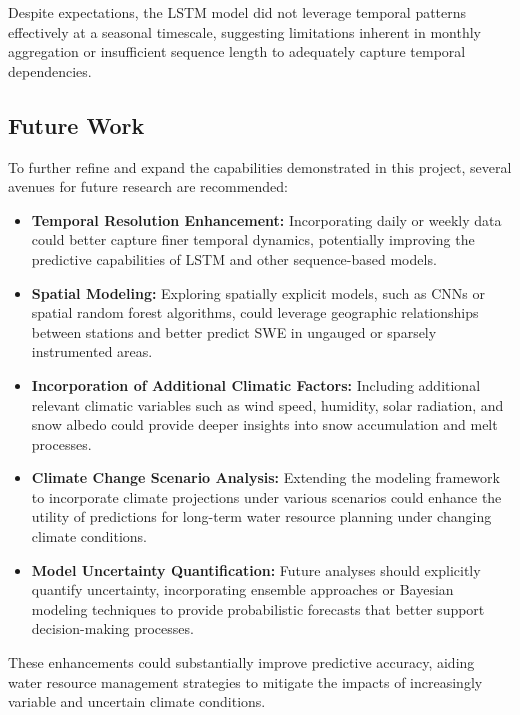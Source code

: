 \documentclass{article}
\begin{document}
Despite expectations, the LSTM model did not leverage temporal patterns effectively at a seasonal timescale, suggesting limitations inherent in monthly aggregation or insufficient sequence length to adequately capture temporal dependencies.

\subsection{Future Work}
To further refine and expand the capabilities demonstrated in this project, several avenues for future research are recommended:

\begin{itemize}
    \item \textbf{Temporal Resolution Enhancement:} Incorporating daily or weekly data could better capture finer temporal dynamics, potentially improving the predictive capabilities of LSTM and other sequence-based models.

    \item \textbf{Spatial Modeling:} Exploring spatially explicit models, such as CNNs or spatial random forest algorithms, could leverage geographic relationships between stations and better predict SWE in ungauged or sparsely instrumented areas.

    \item \textbf{Incorporation of Additional Climatic Factors:} Including additional relevant climatic variables such as wind speed, humidity, solar radiation, and snow albedo could provide deeper insights into snow accumulation and melt processes.

    \item \textbf{Climate Change Scenario Analysis:} Extending the modeling framework to incorporate climate projections under various scenarios could enhance the utility of predictions for long-term water resource planning under changing climate conditions.

    \item \textbf{Model Uncertainty Quantification:} Future analyses should explicitly quantify uncertainty, incorporating ensemble approaches or Bayesian modeling techniques to provide probabilistic forecasts that better support decision-making processes.
\end{itemize}

These enhancements could substantially improve predictive accuracy, aiding water resource management strategies to mitigate the impacts of increasingly variable and uncertain climate conditions.
\end{document}
